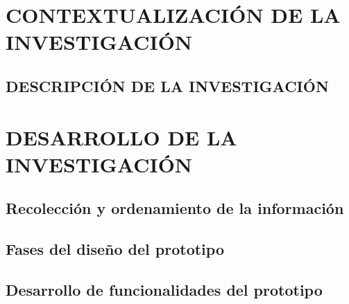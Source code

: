 
%




\renewcommand{\tablename}{\textbf{Tabla}}
\renewcommand{\figurename}{\textbf{Figura}}
\renewcommand{\listtablename}{Lista de Tablas}
\renewcommand{\listfigurename}{Lista de Figuras}
\renewcommand{\contentsname}{Contenido}


\tableofcontents
%

\part{CONTEXTUALIZACIÓN DE LA INVESTIGACIÓN}
\chapter{DESCRIPCIÓN DE LA INVESTIGACIÓN}
%







%
%

\part{DESARROLLO DE LA INVESTIGACIÓN}

\chapter{Recolección y ordenamiento de la información}


\chapter{Fases del diseño del prototipo}





\chapter{Desarrollo de funcionalidades del prototipo}

